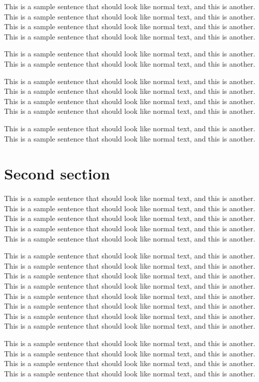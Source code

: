 \documentclass[officiallayout]{tktla}
\begin{document}
This is a sample sentence that should look like normal text, and this
is another. This is a sample sentence that should look like normal
text, and this is another. This is a sample sentence that should look
like normal text, and this is another. This is a sample sentence that
should look like normal text, and this is another.

This is a sample sentence that should look like normal text, and this
is another. This is a sample sentence that should look like normal
text, and this is another.

This is a sample sentence that should look like normal text, and this
is another. This is a sample sentence that should look like normal
text, and this is another. This is a sample sentence that should look
like normal text, and this is another. This is a sample sentence that
should look like normal text, and this is another.

This is a sample sentence that should look like normal text, and this
is another. This is a sample sentence that should look like normal
text, and this is another.

\section{Second section}

This is a sample sentence that should look like normal text, and this
is another. This is a sample sentence that should look like normal
text, and this is another. This is a sample sentence that should look
like normal text, and this is another. This is a sample sentence that
should look like normal text, and this is another. This is a sample
sentence that should look like normal text, and this is another.

This is a sample sentence that should look like normal text, and this
is another. This is a sample sentence that should look like normal
text, and this is another. This is a sample sentence that should look
like normal text, and this is another. This is a sample sentence that
should look like normal text, and this is another. This is a sample
sentence that should look like normal text, and this is another. This
is a sample sentence that should look like normal text, and this is
another. This is a sample sentence that should look like normal text,
and this is another. This is a sample sentence that should look like
normal text, and this is another.

This is a sample sentence that should look like normal text, and this
is another. This is a sample sentence that should look like normal
text, and this is another. This is a sample sentence that should look
like normal text, and this is another. This is a sample sentence that
should look like normal text, and this is another.
\end{document}
